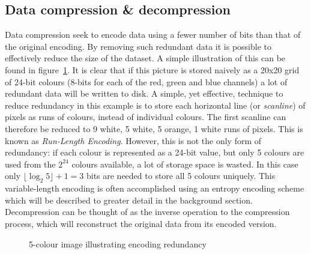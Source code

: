 \subsection{Data compression \& decompression}
Data compression seek to encode data using a fewer number of bits than that of the original encoding. By removing such redundant data it is possible to effectively 
reduce the size of the dataset. A simple illustration of this can be found in figure~\ref{COMP_ILLUS}. It is clear that if this picture is stored naively as a 20x20
grid of 24-bit colours (8-bits for each of the red, green and blue channels) a lot of redundant data will be written to disk. A simple, yet effective, technique to 
reduce redundancy in this example is to store each horizontal line (or \textit{scanline}) of pixels as runs of colours, instead of individual colours. The first 
scanline can therefore be reduced to 9 white, 5 white, 5 orange, 1 white runs of pixels. This is known as \textit{Run-Length Encoding}. However, this is not the only 
form of redundancy: if each colour is represented as a 24-bit value, but only 5 colours are used from the $2^{24}$ colours available, a lot of storage space is wasted. 
In this case only  $\lfloor\log_{2}{5}\rfloor+1 = 3$ bits are needed to store all 5 colours uniquely. This variable-length encoding is often accomplished using an 
entropy encoding scheme which will be described to greater detail in the background section. Decompression can be thought of as the inverse operation to the compression 
process, which will reconstruct the original data from its encoded version.
\begin{figure}[ht!]
\begin{mdframed}
  \centering
 \caption{5-colour image illustrating encoding redundancy}
 \label{COMP_ILLUS}
\end{mdframed}
\end{figure}
